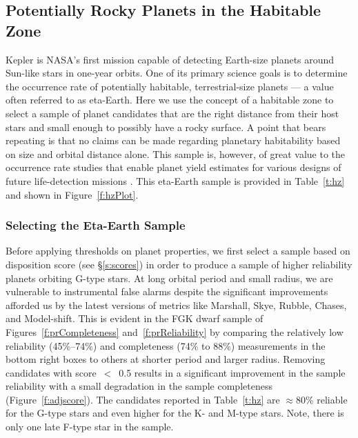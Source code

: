 
\subsection{Potentially Rocky Planets in the Habitable Zone}
\label{s:hz}
Kepler is NASA's first mission capable of detecting Earth-size planets around Sun-like stars in one-year orbits.  One of its primary science goals is to determine the occurrence rate of potentially habitable, terrestrial-size planets --- a value often referred to as eta-Earth.  Here we use the concept of a habitable zone to select a sample of planet candidates that are the right distance from their host stars and small enough to possibly have a rocky surface. A point that bears repeating is that no claims can be made regarding planetary habitability based on size and orbital distance alone.   This sample is, however, of great value to the occurrence rate studies that enable planet yield estimates for various designs of future life-detection missions \citep{stark2015}. This eta-Earth sample is provided in Table~\ref{t:hz} and shown in Figure~\ref{f:hzPlot}.

\subsubsection{Selecting the Eta-Earth Sample}

Before applying thresholds on planet properties, we first select a sample based on disposition score (see \S\ref{s:scores}) in order to produce a sample of higher reliability planets orbiting G-type stars. At long orbital period and small radius, we are vulnerable to instrumental false alarms despite the significant improvements afforded us by the latest versions of metrics like Marshall, Skye, Rubble, Chases, and Model-shift. This is evident in the FGK dwarf sample of Figures~\ref{f:prCompleteness} and~\ref{f:prReliability} by comparing the relatively low reliability (45\%--74\%) and completeness (74\% to 88\%) measurements in the bottom right boxes to others at shorter period and larger radius.  Removing candidates with score~$<$~0.5 results in a significant improvement in the sample reliability with a small degradation in the sample completeness (Figure~\ref{f:adjscore}).  The candidates reported in Table~\ref{t:hz} are $\approx$80\% reliable for the G-type stars and even higher for the K- and M-type stars. Note, there is only one late F-type star in the sample.  


